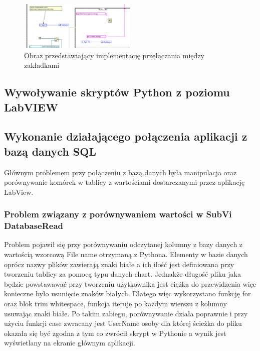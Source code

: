 \documentclass{report}
\begin{document}
\begin{figure}[H]
    \centering
    \includegraphics[width=0.5\textwidth]{src/tab-control-page.png}
    \caption{Obraz przedstawiający implementację przełączania między zakładkami}
    \label{fig:tab-control-page}
\end{figure}



\subsection{\Large Wywoływanie skryptów Python z poziomu LabVIEW}

%
%

\subsection{\Large Wykonanie działającego połączenia aplikacji z bazą danych SQL}

%
%

Głównym problemem przy połączeniu z bazą danych była manipulacja oraz porównywanie komórek w tablicy z wartościami dostarczanymi przez aplikację LabView.

\subsubsection{\large Problem związany z porównywaniem wartości w SubVi DatabaseRead}
Problem pojawił się przy porównywaniu odczytanej kolumny z bazy danych z wartością wzorcową File name otrzymaną z Pythona. Elementy w bazie danych oprócz nazwy plików zawierają znaki białe a ich ilość
jest definiowana przy tworzeniu tablicy za pomocą typu danych chart. Jednakże długość pliku jaka będzie powstawawać przy tworzeniu użytkownika jest ciężka do przewidzenia więc konieczne było
usunięcie znaków białych. Dlatego więc wykorzystano funkcję for oraz blok trim whitespace, funkcja iteruje po każdym wierszu z kolumny usuwając znaki białe.
Po takim zabiegu, porównywanie działa poprawnie i przy użyciu funkcji case zwracany jest UserName osoby dla której ścieżka do pliku okazała się być zgodna z tym co zwrócił skrypt w Pythonie a
wynik jest wyświetlany na ekranie głównym aplikacji.
\end{document}
